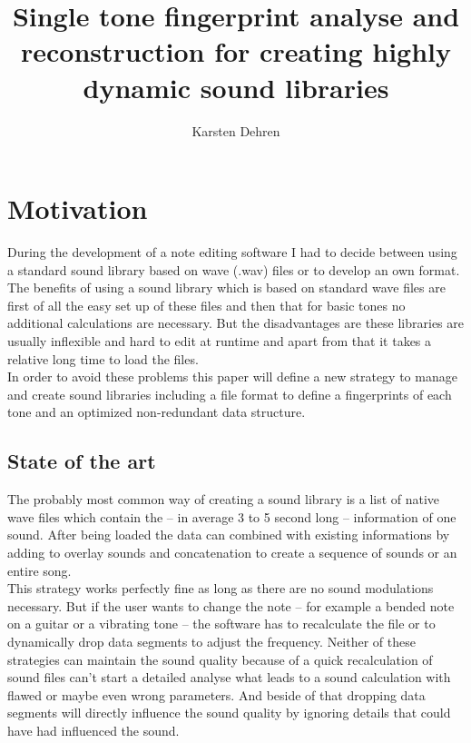 \documentclass[a4paper,12pt]{report}
\title{\LARGE {\bf Single tone fingerprint analyse and reconstruction for creating highly dynamic sound libraries}\\
	\vspace*{6mm}
}
\author{Karsten Dehren}
\begin{document}
	
	\maketitle
	
	
	\tableofcontents
		
	\chapter{Motivation}
	
	During the development of a note editing software I had to decide between using a standard sound library based on wave (.wav) files or to develop an own format. 
	\\The benefits of using a sound library which is based on standard wave files are first of all the easy set up of these files and then that for basic tones no additional calculations are necessary. But the disadvantages are these libraries are usually inflexible and hard to edit at runtime and apart from that it takes a relative long time to load the files.
	\\In order to avoid these problems this paper will define a new strategy to manage and create sound libraries including a file format to define a fingerprints of each tone and an optimized non-redundant data structure.
	
	\section{State of the art}
	
	The probably most common way of creating a sound library is a list of native wave files which contain the -- in average 3 to 5 second long -- information of one sound. After being loaded the data can combined with existing informations by adding to overlay sounds and concatenation to create a sequence of sounds or an entire song.
	\\This strategy works perfectly fine as long as there are no sound modulations necessary. But if the user wants to change the note -- for example a bended note on a guitar or a vibrating tone -- the software has to recalculate the file or to dynamically drop data segments to adjust the frequency. Neither of these strategies can maintain the sound quality because of a quick recalculation of sound files can’t start a detailed analyse what leads to a sound calculation with flawed or maybe even wrong parameters. And beside of that dropping data segments will directly influence the sound quality by ignoring details that could have had influenced the sound.
			
\end{document}
